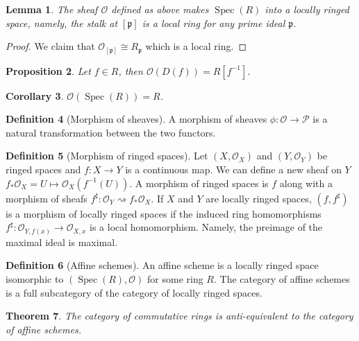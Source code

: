 \documentclass[paper=a4, fontsize=12pt]{scrartcl} %
\newtheorem{thm}{Theorem}
\newtheorem{cor}[thm]{Corollary}
\newtheorem{prop}[thm]{Proposition}
\newtheorem{lem}[thm]{Lemma}
\theoremstyle{definition}
\newtheorem{defn}[thm]{Definition}
\theoremstyle{remark}
\newcommand{\mO}{\mathcal{O}}
\newcommand{\lp}{{\mathfrak{p}}}
\DeclareMathOperator{\spec}{Spec}
\begin{document}
\begin{lem}
	The sheaf $\mO$ defined as above makes $\spec(R)$ into a locally ringed space, namely, the stalk at $[\lp]$ is a local ring for any prime ideal $\lp$.
\end{lem}
\begin{proof}
	We claim that $\mO_{[\lp]} \cong R_{\lp}$ which is a local ring.
\end{proof}
\begin{prop}
	Let $f \in R$, then $\mO(D(f)) = R[f^{-1}]$.
\end{prop}
\begin{cor}
	$\mO(\spec(R)) = R$.
\end{cor}
\begin{defn}[Morphism of sheaves]
	A morphism of sheaves $\phi: \mO \rightarrow \mathcal{P}$ is a natural transformation between the two functors.
\end{defn}
\begin{defn}[Morphism of ringed spaces]
	Let $(X, \mO_X)$ and $(Y, \mO_Y)$ be ringed spaces and $f:X\rightarrow Y$ is a continuous map. We can define a new sheaf on $Y$ $f_*\mO_X = U \mapsto \mO_X(f^{-1}(U))$. A morphism of ringed spaces is $f$ along with a morphism of sheafs $f^{\sharp} : \mO_Y \rightsquigarrow f_*\mO_X$. If $X$ and $Y$ are locally ringed spaces, $(f, f^{\sharp})$ is a morphism of locally ringed spaces if the induced ring homomorphisms $f^{\sharp}: \mO_{Y, f(x)} \rightarrow \mO_{X,x}$ is a local homomorphism. Namely, the preimage of the maximal ideal is maximal.
\end{defn}
\begin{defn}[Affine schemes]
	An affine scheme is a locally ringed space isomorphic to $(\spec(R), \mO)$ for some ring $R$. The category of affine schemes is a full subcategory of the category of locally ringed spaces.
\end{defn}
\begin{thm}
	The category of commutative rings is anti-equivalent to the category of affine schemes.
\end{thm}
\end{document}
